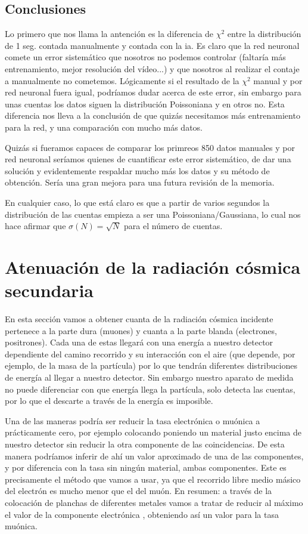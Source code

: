\documentclass[11pt]{article}
\begin{document}
\subsection{Conclusiones}

Lo primero que nos llama la antención es la diferencia de $\chi^2$ entre la distribución de 1 seg. contada manualmente y contada con la ia. Es claro que la red neuronal comete un error sistemático que nosotros no podemos controlar (faltaría más entrenamiento, mejor resolución del vídeo...) y que nosotros al realizar el contaje a manualmente no cometemos. Lógicamente si el resultado de la $\chi^2$ manual y por red neuronal fuera igual, podríamos dudar acerca de este error, sin embargo para unas cuentas los datos siguen la distribución Poissoniana y en otros no. Esta diferencia nos lleva a la conclusión de que quizás necesitamos más entrenamiento para la red, y una comparación con mucho más datos. 

Quizás si fueramos capaces de comparar los primreos 850 datos manuales y por red neuronal seríamos quienes de cuantificar este error sistemático, de dar una solución y evidentemente respaldar mucho más los datos y su método de obtención. Sería una gran mejora para una futura revisión de la memoria.


En cualquier caso, lo que está claro es que a partir de varios segundos la distribución de las cuentas empieza a ser una Poissoniana/Gaussiana, lo cual nos hace afirmar que $\sigma(N)=\sqrt{N}$ para el número de cuentas. 


\section{Atenuación de la radiación cósmica secundaria}

En esta sección vamos a obtener cuanta de la radiación cósmica incidente pertenece a la parte dura (muones) y cuanta a la parte blanda (electrones, positrones). Cada una de estas llegará con una energía a nuestro detector dependiente del camino recorrido y su interacción con el aire (que depende, por ejemplo, de la masa de la partícula) por lo que tendrán diferentes distribuciones de energía al llegar a nuestro detector. Sin embargo nuestro aparato de medida no puede diferenciar con que energía llega la partícula, solo detecta las cuentas, por lo que el descarte a través de la energía es imposible. 

Una de las maneras podría ser reducir la tasa electrónica o muónica a prácticamente cero, por ejemplo colocando poniendo un material justo encima de nuestro detector sin reducir la otra componente de las coincidencias. De esta manera podríamos inferir de ahí un valor aproximado de una de las componentes, y por diferencia con la tasa sin ningún material, ambas componentes. Este es precisamente el método que vamos a usar, ya que el recorrido libre medio másico del electrón es mucho menor que el del muón. En resumen: a través de la colocación de planchas de diferentes metales vamos a tratar de reducir al máximo el valor de la componente electrónica , obteniendo así un valor para la tasa muónica. 
\end{document}
